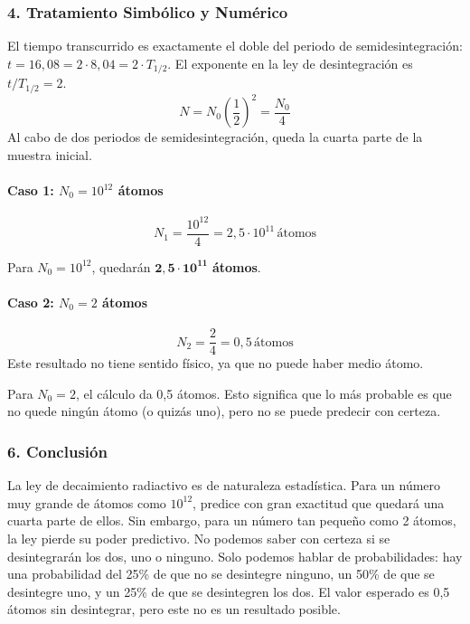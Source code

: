 \subsubsection*{4. Tratamiento Simbólico y Numérico}
El tiempo transcurrido es exactamente el doble del periodo de semidesintegración: $t = 16,08 = 2 \cdot 8,04 = 2 \cdot T_{1/2}$.
El exponente en la ley de desintegración es $t/T_{1/2} = 2$.
$$N = N_0 \left(\frac{1}{2}\right)^2 = \frac{N_0}{4}$$
Al cabo de dos periodos de semidesintegración, queda la cuarta parte de la muestra inicial.

\paragraph*{Caso 1: $N_0 = 10^{12}$ átomos}
$$N_1 = \frac{10^{12}}{4} = 2,5 \cdot 10^{11} \, \text{átomos}$$
\begin{cajaresultado}
    Para $N_0 = 10^{12}$, quedarán $\boldsymbol{2,5 \cdot 10^{11}}$ \textbf{átomos}.
\end{cajaresultado}

\paragraph*{Caso 2: $N_0 = 2$ átomos}
$$N_2 = \frac{2}{4} = 0,5 \, \text{átomos}$$
Este resultado no tiene sentido físico, ya que no puede haber medio átomo.
\begin{cajaresultado}
    Para $N_0 = 2$, el cálculo da 0,5 átomos. Esto significa que lo más probable es que no quede ningún átomo (o quizás uno), pero no se puede predecir con certeza.
\end{cajaresultado}

\subsubsection*{6. Conclusión}
\begin{cajaconclusion}
La ley de decaimiento radiactivo es de naturaleza estadística. Para un número muy grande de átomos como $10^{12}$, predice con gran exactitud que quedará una cuarta parte de ellos. Sin embargo, para un número tan pequeño como 2 átomos, la ley pierde su poder predictivo. No podemos saber con certeza si se desintegrarán los dos, uno o ninguno. Solo podemos hablar de probabilidades: hay una probabilidad del 25\% de que no se desintegre ninguno, un 50\% de que se desintegre uno, y un 25\% de que se desintegren los dos. El valor esperado es 0,5 átomos sin desintegrar, pero este no es un resultado posible.
\end{cajaconclusion}

